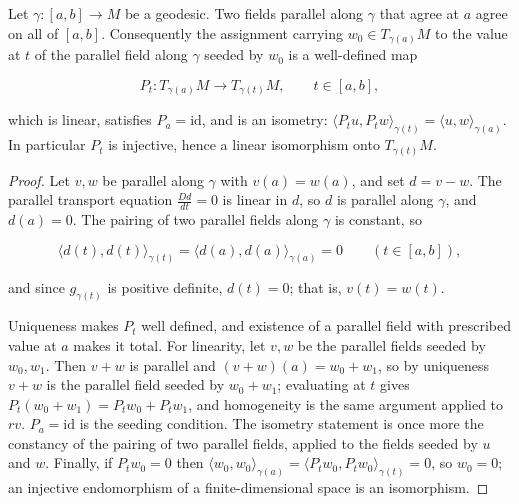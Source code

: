 \begin{lemma}
  \label{lem:dc-ch8-2-1-parallel-transport-map}
  \leanok
  Let $\gamma:[a,b]\to M$ be a geodesic. Two fields parallel along $\gamma$ that agree at $a$
  agree on all of $[a,b]$. Consequently the assignment carrying $w_0\in T_{\gamma(a)}M$ to the
  value at $t$ of the parallel field along $\gamma$ seeded by $w_0$ is a well-defined map

  $$
  P_t:T_{\gamma(a)}M\longrightarrow T_{\gamma(t)}M,\qquad t\in[a,b],
  $$

  which is linear, satisfies $P_a=\mathrm{id}$, and is an isometry:
  $\langle P_tu,P_tw\rangle_{\gamma(t)}=\langle u,w\rangle_{\gamma(a)}$. In particular $P_t$ is
  injective, hence a linear isomorphism onto $T_{\gamma(t)}M$.
\end{lemma}
\begin{proof}
  \leanok
\sketch
  Let $v,w$ be parallel along $\gamma$ with $v(a)=w(a)$, and set $d=v-w$. The parallel
  transport equation $\frac{Dd}{dt}=0$ is linear in $d$, so $d$ is parallel along $\gamma$,
  and $d(a)=0$. The pairing of two parallel fields along $\gamma$ is constant, so

  $$
  \langle d(t),d(t)\rangle_{\gamma(t)}=\langle d(a),d(a)\rangle_{\gamma(a)}=0
  \qquad(t\in[a,b]),
  $$

  and since $g_{\gamma(t)}$ is positive definite, $d(t)=0$; that is, $v(t)=w(t)$.

  Uniqueness makes $P_t$ well defined, and existence of a parallel field with prescribed value
  at $a$ makes it total. For linearity, let $v,w$ be the parallel fields seeded by $w_0,w_1$.
  Then $v+w$ is parallel and $(v+w)(a)=w_0+w_1$, so by uniqueness $v+w$ is the parallel field
  seeded by $w_0+w_1$; evaluating at $t$ gives $P_t(w_0+w_1)=P_tw_0+P_tw_1$, and homogeneity is
  the same argument applied to $rv$. $P_a=\mathrm{id}$ is the seeding condition. The isometry
  statement is once more the constancy of the pairing of two parallel fields, applied to the
  fields seeded by $u$ and $w$. Finally, if $P_tw_0=0$ then
  $\langle w_0,w_0\rangle_{\gamma(a)}=\langle P_tw_0,P_tw_0\rangle_{\gamma(t)}=0$, so $w_0=0$;
  an injective endomorphism of a finite-dimensional space is an isomorphism.
\end{proof}

